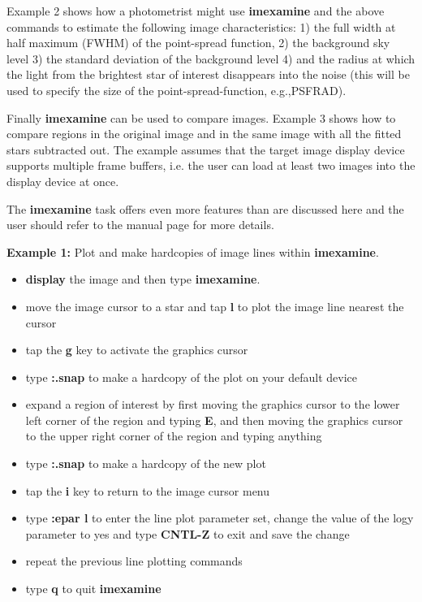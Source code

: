 Example 2 shows how a photometrist might use {\bf imexamine}
and the above commands to estimate the following image characteristics:
1) the full width at
half maximum (FWHM) of the point-spread function, 2) the background sky level
3) the standard deviation of the background level 4) and the radius at which
the light from the brightest star of interest disappears into the noise
(this will be used to specify the size of the point-spread-function,
e.g.,PSFRAD).
 
Finally {\bf imexamine} can be used to compare images. Example 3
shows how to compare regions in the original image and in the
same image with all the fitted stars subtracted out. The example
assumes that the target image display device supports multiple frame buffers,
i.e. the user can load at
least two images into the display device at once.
 
The {\bf imexamine} task offers even more features than are discussed here and the
user should refer to the manual page for more details.
 
\vspace{12pt}
{\bf Example 1:} Plot and make hardcopies of image lines within {\bf imexamine}.
 
\begin{itemize}
\item {\bf display} the image and then type {\bf imexamine}.
\item move the image cursor to a star and tap {\bf l} to plot the image
line nearest the cursor
\item tap the {\bf g} key to activate the graphics cursor
\item type {\bf :.snap} to make a hardcopy of the plot on your default device
\item expand a region of interest by first moving the graphics
cursor to the lower left corner of the region and typing {\bf E},
and then moving the graphics cursor to the upper right corner
of the region and typing anything
\item type {\bf :.snap} to make a hardcopy of the new plot
\item tap the {\bf i} key to return to the image cursor menu
\item type {\bf :epar l} to enter the line plot parameter set, change the
value of the logy parameter to yes and type {\bf CNTL-Z} to exit and
save the change
\item  repeat the previous line plotting commands
\item type {\bf q} to quit {\bf imexamine}
\end{itemize}
 
